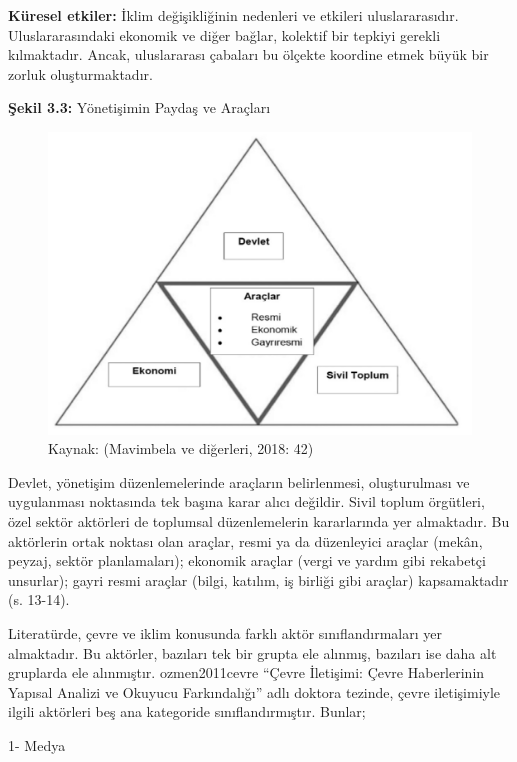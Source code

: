 \documentclass[
]{book}
\begin{document}
\textbf{Küresel etkiler:} İklim değişikliğinin nedenleri ve etkileri uluslararasıdır. Uluslararasındaki ekonomik ve diğer bağlar, kolektif bir tepkiyi gerekli kılmaktadır. Ancak, uluslararası çabaları bu ölçekte koordine etmek büyük bir zorluk oluşturmaktadır.

\textbf{Şekil 3.3:} Yönetişimin Paydaş ve Araçları

\begin{figure}
\includegraphics[width=0.95\linewidth,height=0.95\textheight]{tablolar-sekiller/sekil-3-3} \caption{Kaynak: (Mavimbela ve diğerleri, 2018: 42)}\label{fig:unnamed-chunk-6}
\end{figure}

Devlet, yönetişim düzenlemelerinde araçların belirlenmesi, oluşturulması ve uygulanması noktasında tek başına karar alıcı değildir. Sivil toplum örgütleri, özel sektör aktörleri de toplumsal düzenlemelerin kararlarında yer almaktadır. Bu aktörlerin ortak noktası olan araçlar, resmi ya da düzenleyici araçlar (mekân, peyzaj, sektör planlamaları); ekonomik araçlar (vergi ve yardım gibi rekabetçi unsurlar); gayri resmi araçlar (bilgi, katılım, iş birliği gibi araçlar) kapsamaktadır (s. 13-14). \citep{frohlich2013conceptualising}

Literatürde, çevre ve iklim konusunda farklı aktör sınıflandırmaları yer almaktadır. Bu aktörler, bazıları tek bir grupta ele alınmış, bazıları ise daha alt gruplarda ele alınmıştır. ozmen2011cevre ``Çevre İletişimi: Çevre Haberlerinin Yapısal Analizi ve Okuyucu Farkındalığı'' adlı doktora tezinde, çevre iletişimiyle ilgili aktörleri beş ana kategoride sınıflandırmıştır. Bunlar;

1- Medya
\end{document}
